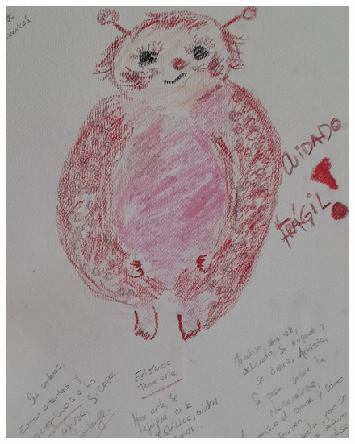 \documentclass[12pt, a4paper, twoside]{book} %
\begin{document}
\begin{figure}[H]
	\centering
	\includegraphics[width=\textwidth]{./images/1f81324df3d3e3.jpg}
\end{figure}
\end{document}
